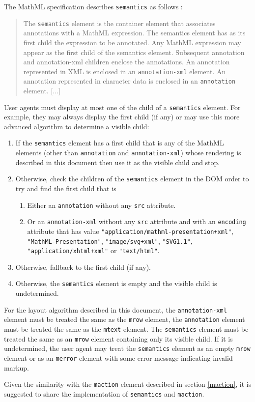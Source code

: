 The MathML specification describes {\tt semantics} as follows \cite{MathML3}:
%
\begin{quote}
The {\tt semantics} element is the container element that associates
annotations with a MathML expression. The semantics element has as its first
child the expression to be annotated. Any MathML expression may appear as the
first child of the semantics element. Subsequent annotation and annotation-xml
children enclose the annotations. An annotation represented in XML is enclosed
in an {\tt annotation-xml} element. An annotation represented in character data
is enclosed in an {\tt annotation} element.
[...]
\end{quote}

User agents must display at most one of the child of a {\tt semantics} element.
For example, they may always display the first child (if any) or may use this
more advanced algorithm to determine a visible child:
\begin{enumerate}
\item If the {\tt semantics} element has a first child that is any of the
  MathML elements (other than {\tt annotation} and {\tt annotation-xml})
  whose rendering is described in this document then use it as the visible
  child and stop.
\item Otherwise, check the children of the {\tt semantics} element in the DOM
  order to try and find the first child that is
  \begin{enumerate}
  \item Either an {\tt annotation} without any {\tt src} attribute.
  \item Or an {\tt annotation-xml} without any {\tt src} attribute and
    with an {\tt encoding} attribute that has value
    {\tt "application/mathml-presentation+xml"},
    {\tt "MathML-Presentation"},
    {\tt "image/svg+xml"},
    {\tt "SVG1.1"},
    {\tt "application/xhtml+xml"} or
    {\tt "text/html"}.
  \end{enumerate}
\item Otherwise, fallback to the first child (if any).
\item Otherwise, the {\tt semantics} element is empty and the visible child is
  undetermined.
\end{enumerate}

For the layout algorithm described in this document, the
{\tt annotation-xml} element must be treated the same as the {\tt mrow} element,
the {\tt annotation} element must be treated the same as the {\tt mtext}
element. The {\tt semantics} element must be treated the same as an
{\tt mrow} element containing only its visible child. If it is undetermined,
the user agent may treat the {\tt semantics} element as an
empty {\tt mrow} element or as an {\tt merror} element with some error message
indicating invalid markup.

Given the similarity with the {\tt maction} element
described in section \ref{maction}, it is
suggested to share the implementation of {\tt semantics} and {\tt maction}.
